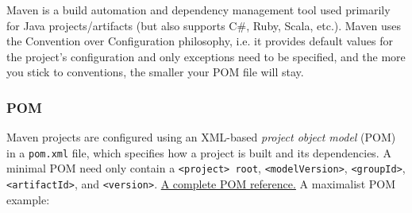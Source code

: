 \documentclass[8pt, table, xcdraw]{article}%
\begin{document}
Maven is a build automation and dependency management tool used primarily for Java projects/artifacts (but also supports C\#, Ruby, Scala, etc.). Maven uses the Convention over Configuration philosophy, i.e. it provides default values for the project's configuration and only exceptions need to be specified, and the more you stick to conventions, the smaller your POM file will stay. 

\subsubsection{POM}

Maven projects are configured using an XML-based \emph{project object model} (POM) in a \lstinline{pom.xml} file, which specifies how a project is built and its dependencies. A minimal POM need only contain a \lstinline{<project> root}, \lstinline{<modelVersion>}, \lstinline{<groupId>}, \lstinline{<artifactId>}, and \lstinline{<version>}. \href{https://maven.apache.org/ref/3.9.6/maven-model/maven.html}{A complete POM reference.} A maximalist POM example:
\end{document}

